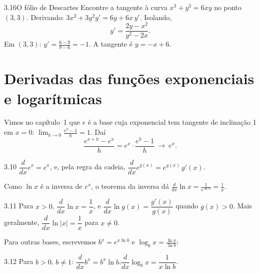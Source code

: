 \begin{exemplo}{3.16}{O fólio de Descartes}
Encontre a tangente à curva $x^3+y^3=6xy$ no ponto $(3,3)$.
\solucao
Derivando: $3x^2+3y^2y'=6y+6x\,y'$. Isolando,
\[
y'=\frac{2y-x^2}{y^2-2x}.
\]
Em $(3,3)$: $y'=\frac{6-9}{9-6}=-1$. A tangente é $y=-x+6$.
\end{exemplo}

\section{Derivadas das funções exponenciais e logarítmicas}

Vimos no capítulo~1 que $e$ é a base cuja exponencial tem tangente de inclinação 1 em
$x=0$: $\lim_{h\to0}\frac{e^h-1}{h}=1$. Daí
\[
\frac{e^{x+h}-e^x}{h}=e^x\cdot\frac{e^h-1}{h}\ \longrightarrow\ e^x .
\]

\begin{teorema}{3.10}
$\dfrac{d}{dx}e^x=e^x$, e, pela regra da cadeia, $\dfrac{d}{dx}e^{g(x)}=e^{g(x)}\,g'(x)$.
\end{teorema}

Como $\ln x$ é a inversa de $e^x$, o teorema da inversa dá
$\frac{d}{dx}\ln x=\frac{1}{e^{\ln x}}=\frac1x$.

\begin{teorema}{3.11}
Para $x>0$, $\dfrac{d}{dx}\ln x=\dfrac1x$, e $\dfrac{d}{dx}\ln g(x)=\dfrac{g'(x)}{g(x)}$
quando $g(x)>0$. Mais geralmente, $\dfrac{d}{dx}\ln|x|=\dfrac1x$ para $x\neq0$.
\end{teorema}

Para outras bases, escrevemos $b^x=e^{x\ln b}$ e $\log_bx=\frac{\ln x}{\ln b}$:

\begin{teorema}{3.12}
Para $b>0$, $b\neq1$:\qquad
$\dfrac{d}{dx}b^x=b^x\ln b$,\qquad $\dfrac{d}{dx}\log_bx=\dfrac{1}{x\ln b}$.
\end{teorema}

